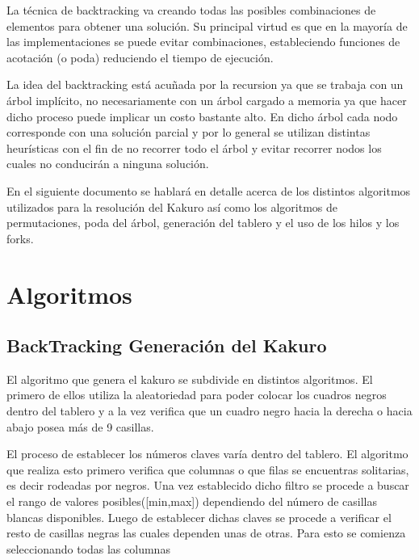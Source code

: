 \documentclass[conference]{IEEEtran}
\begin{document}
\par
La técnica de backtracking va creando todas las posibles combinaciones de elementos para obtener una solución. Su principal virtud es que en la mayoría de las implementaciones se puede evitar combinaciones, estableciendo funciones de acotación (o poda) reduciendo el tiempo de ejecución.

\par
La idea del backtracking está acuñada por la recursion ya que se trabaja con un árbol implícito, no necesariamente con un árbol cargado a memoria ya que hacer dicho proceso puede implicar un costo bastante alto. En dicho árbol cada nodo corresponde con una solución parcial y por lo general se utilizan distintas heurísticas con el fin de no recorrer todo el árbol y evitar recorrer nodos los cuales no conducirán a ninguna solución.

\par 
En el siguiente documento se hablará en detalle acerca de los distintos algoritmos utilizados para la resolución del Kakuro así como los algoritmos de permutaciones, poda del árbol, generación del tablero y el uso de los hilos y los forks.


 

\section{Algoritmos}

\subsection{BackTracking Generación del Kakuro}

El algoritmo que genera el kakuro se subdivide en distintos algoritmos. El primero de ellos utiliza la aleatoriedad para poder colocar los cuadros negros dentro del tablero y a la vez verifica que un cuadro negro hacia la derecha o hacia abajo posea más de 9 casillas.

\par
El proceso de establecer los números claves varía dentro del tablero. El algoritmo que realiza esto primero verifica que columnas o que filas se encuentras solitarias, es decir rodeadas por negros. Una vez establecido dicho filtro se procede a buscar el rango de valores posibles([min,max]) dependiendo del número de casillas blancas disponibles. Luego de establecer dichas claves se procede a verificar el resto de casillas negras las cuales dependen unas de otras. Para esto se comienza seleccionando todas las columnas
\end{document}

